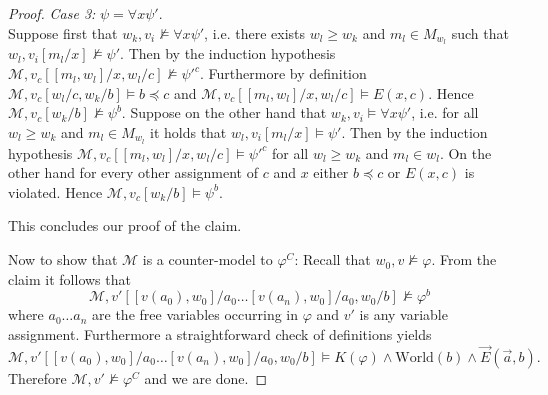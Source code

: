 \documentclass{easychair}
\theoremstyle{definition}
\theoremstyle{definition}
\theoremstyle{definition}
\theoremstyle{definition}
\theoremstyle{definition}
\theoremstyle{definition}
\theoremstyle{definition}
\begin{document}
\begin{proof}
	\emph{Case 3:} $\psi = \forall x\psi'$.\\
	Suppose first that $w_k, v_i\not\models \forall x\psi'$, i.e. there exists $w_l\geq w_k$ and $m_l\in M_{w_l}$ such that $w_l, v_i[m_l/x]\not\models \psi'$. Then by the induction hypothesis $\mathcal M, v_c[[m_l, w_l]/x,w_l/c]\not\models \psi'^c$. Furthermore by definition $\mathcal M, v_c[w_l/c, w_k/b]\models b\preceq c$ and $\mathcal M, v_c[[m_l, w_l]/x,w_l/c]\models E(x, c)$. Hence $\mathcal M, v_c[w_k/b]\not\models \psi^b$. Suppose on the other hand that $w_k, v_i\models\forall x\psi'$, i.e. for all $w_l\geq w_k$ and $m_l\in M_{w_l}$ it holds that $w_l, v_i[m_l/x]\models \psi'$. Then by the induction hypothesis $\mathcal M, v_c[[m_l, w_l]/x,w_l/c]\models \psi'^c$ for all $w_l\geq w_k$ and $m_l\in w_l$. On the other hand for every other assignment of $c$ and $x$ either $b\preceq c$ or $E(x, c)$ is violated. Hence $\mathcal M, v_c[w_k/b]\models \psi^b$.

	This concludes our proof of the claim.

	Now to show that $\mathcal M$ is a counter-model to $\varphi^C$:
	Recall that $w_0, v\not\models\varphi$. From the claim it follows that \[\mathcal M, v'[[v(a_0), w_0]/a_0\dots[v(a_n), w_0]/a_0, w_0/b]\not\models \varphi^b\]where $a_0\dots a_n$ are the free variables occurring in $\varphi$ and $v'$ is any variable assignment. Furthermore a straightforward check of definitions yields \[\mathcal M, v'[[v(a_0), w_0]/a_0\dots[v(a_n), w_0]/a_0, w_0/b]\models K(\varphi)\wedge \text{World}(b)\wedge\vec E(\vec a, b).\]Therefore $\mathcal M, v'\not\models \varphi^C$ and we are done.
\end{proof}
\end{document}
